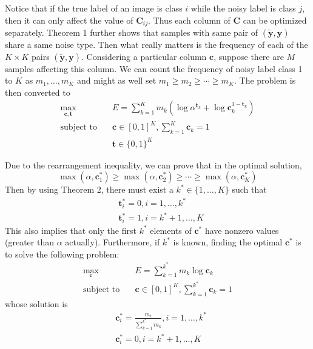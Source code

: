 \documentclass[10pt,twocolumn,letterpaper]{article}
\def\vec{\mathbf}
\def\mat{\mathbf}
\begin{document}
Notice that if the true label of an image is class $i$ while the noisy label is class $j$, then it can only affect the value of $\mat{C}_{ij}$. Thus each column of $\mat{C}$ can be optimized separately. Theorem 1 further shows that samples with same pair of $(\tilde{\vec{y}},\vec{y})$ share a same noise type. Then what really matters is the frequency of each of the $K\times K$ pairs $(\tilde{\vec{y}},\vec{y})$. Considering a particular column $\vec{c}$, suppose there are $M$ samples affecting this column. We can count the frequency of noisy label class 1 to $K$ as $m_1,\dots,m_K$ and might as well set $m_1\geq m_2\geq \cdots \geq m_K$. The problem is then converted to
\begin{equation}
\begin{aligned}
\max_{\vec{c},\vec{t}} \quad & E=\sum_{k=1}^{K} m_k \left(\log \alpha^{\vec{t}_k} + \log \mat{c}_k^{1-\vec{t}_k}\right)\\
\text{subject to} \quad & \vec{c} \in [0,1]^K, \sum_{k=1}^{K} \vec{c}_k = 1 \\
                    & \vec{t} \in \{0,1\}^{K}
\end{aligned}
\end{equation}

Due to the rearrangement inequality, we can prove that in the optimal solution,
\begin{equation}
    \max(\alpha,\vec{c}^*_1) \geq \max(\alpha,\vec{c}^*_2) \geq \cdots \geq \max(\alpha,\vec{c}^*_K)
\end{equation}
Then by using Theorem 2, there must exist a $k^* \in \{1,\dots,K\}$ such that
\begin{equation} \label{eq:opt_t}
\begin{aligned}
    &\vec{t}^*_i = 0, i = 1,\dots,k^* \\
    &\vec{t}^*_i = 1, i = k^*+1,\dots,K
\end{aligned}
\end{equation}
This also implies that only the first $k^*$ elements of $\vec{c}^*$ have nonzero values (greater than $\alpha$ actually). Furthermore, if $k^*$ is known, finding the optimal $\vec{c}^*$ is to solve the following problem:
\begin{equation}
\begin{aligned}
\max_{\vec{c}} \quad & E=\sum_{k=1}^{k^*} m_k \log \mat{c}_k\\
\text{subject to} \quad & \vec{c} \in [0,1]^K, \sum_{k=1}^{k^*} \vec{c}_k = 1
\end{aligned}
\end{equation}
whose solution is
\begin{equation} \label{eq:opt_c}
\begin{aligned}
    &\vec{c}^*_i = \frac{m_i}{\sum_{k=1}^{k^*}{m_k}}, i = 1,\dots,k^* \\
    &\vec{c}^*_i = 0, i = k^*+1,\dots,K
\end{aligned}
\end{equation}
\end{document}
